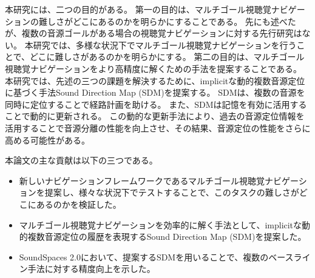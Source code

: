本研究には、二つの目的がある。
第一の目的は、マルチゴール視聴覚ナビゲーションの難しさがどこにあるのかを明らかにすることである。
先にも述べたが、複数の音源ゴールがある場合の視聴覚ナビゲーションに対する先行研究はない。
本研究では、多様な状況下でマルチゴール視聴覚ナビゲーションを行うことで、どこに難しさがあるのかを明らかにする。
第二の目的は、マルチゴール視聴覚ナビゲーションをより高精度に解くための手法を提案することである。
本研究では、先述の三つの課題を解決するために、implicitな動的複数音源定位に基づく手法Sound Direction Map (SDM)を提案する。
SDMは、複数の音源を同時に定位することで経路計画を助ける。
また、SDMは記憶を有効に活用することで動的に更新される。
この動的な更新手法により、過去の音源定位情報を活用することで音源分離の性能を向上させ、その結果、音源定位の性能をさらに高める可能性がある。

本論文の主な貢献は以下の三つである。

\begin{itemize}[leftmargin=*]
\item 新しいナビゲーションフレームワークであるマルチゴール視聴覚ナビゲーションを提案し、様々な状況下でテストすることで、このタスクの難しさがどこにあるのかを検証した。
\item マルチゴール視聴覚ナビゲーションを効率的に解く手法として、implicitな動的複数音源定位の履歴を表現するSound Direction Map (SDM)を提案した。
\item SoundSpaces 2.0において、提案するSDMを用いることで、複数のベースライン手法に対する精度向上を示した。
\end{itemize}